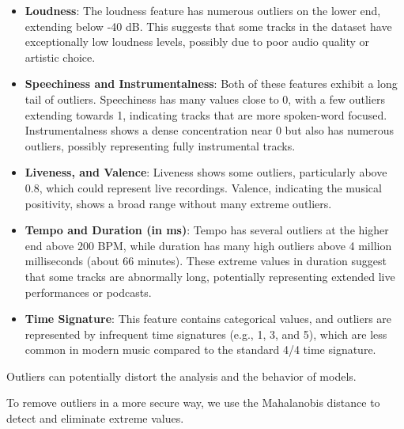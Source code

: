 \begin{itemize}    
    \item \textbf{Loudness}: The loudness feature has numerous outliers on the lower end, extending below -40 dB. This suggests that some tracks in the dataset have exceptionally low loudness levels, possibly due to poor audio quality or artistic choice.

    \item \textbf{Speechiness and Instrumentalness}: Both of these features exhibit a long tail of outliers. Speechiness has many values close to 0, with a few outliers extending towards 1, indicating tracks that are more spoken-word focused. Instrumentalness shows a dense concentration near 0 but also has numerous outliers, possibly representing fully instrumental tracks.

    \item \textbf{Liveness, and Valence}: Liveness shows some outliers, particularly above 0.8, which could represent live recordings. Valence, indicating the musical positivity, shows a broad range without many extreme outliers.

    \item \textbf{Tempo and Duration (in ms)}: Tempo has several outliers at the higher end above 200 BPM, while duration has many high outliers above 4 million milliseconds (about 66 minutes). These extreme values in duration suggest that some tracks are abnormally long, potentially representing extended live performances or podcasts.

    \item \textbf{Time Signature}: This feature contains categorical values, and outliers are represented by infrequent time signatures (e.g., 1, 3, and 5), which are less common in modern music compared to the standard 4/4 time signature.
\end{itemize}


Outliers can potentially distort the analysis and the behavior of models. 

\newpage
To remove outliers in a more secure way, we use the Mahalanobis distance to detect and eliminate extreme values.


